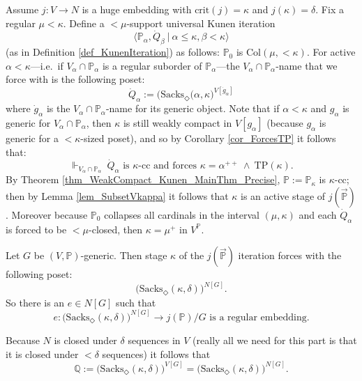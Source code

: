 \documentclass{amsart}
\begin{document}
Assume $j: V \to N$ is a huge embedding with $\text{crit}(j) = \kappa$ and $j(\kappa) = \delta$.  Fix a regular $\mu < \kappa$.  Define a $<\mu$-support universal Kunen iteration  
\[
\langle \mathbb{P}_\alpha, \dot{Q}_\beta \ | \ \alpha \le \kappa, \beta < \kappa \rangle
\]
(as in Definition \ref{def_KunenIteration}) as follows:  $\mathbb{P}_0$ is $\text{Col}(\mu, < \kappa)$.  For active $\alpha < \kappa$---i.e.\ if $V_\alpha \cap \mathbb{P}_\alpha$ is a regular suborder of $\mathbb{P}_\alpha$---the $V_\alpha \cap \mathbb{P}_\alpha$-name that we force with is the following poset:
\[
\dot{Q}_\alpha:= \Big(  \text{Sacks}_\Diamond(\alpha, \kappa \Big)^{V[\dot{g}_\alpha]}
\]
where $\dot{g}_\alpha$ is the $V_\alpha \cap \mathbb{P}_\alpha$-name for its generic object.  Note that if $\alpha < \kappa$ and $g_\alpha$ is generic for $V_\alpha \cap \mathbb{P}_\alpha$, then $\kappa$ is still weakly compact in $V[g_\alpha]$ (because $g_\alpha$ is generic for a $<\kappa$-sized poset), and so by Corollary \ref{cor_ForcesTP} it follows that:
\begin{equation*}
\Vdash_{V_\alpha \cap \mathbb{P}_\alpha} \ \dot{Q}_\alpha \text{ is } \kappa \text{-cc and forces } \kappa = \alpha^{++} \ \wedge \ \text{TP}(\kappa) .
\end{equation*}
By Theorem \ref{thm_WeakCompact_Kunen_MainThm_Precise}, $\mathbb{P}:= \mathbb{P}_\kappa$ is $\kappa$-cc; then by Lemma \ref{lem_SubsetVkappa} it follows that $\kappa$ is an active stage of $j(\vec{\mathbb{P}})$.  Moreover because $\mathbb{P}_0$ collapses all cardinals in the interval $(\mu,\kappa)$ and each $\dot{Q}_\alpha$ is forced to be $<\mu$-closed, then $\kappa = \mu^+$ in $V^{\mathbb{P}}$.  

Let $G$ be $(V,\mathbb{P})$-generic.  Then stage $\kappa$ of the $j(\vec{\mathbb{P}})$ iteration forces with the following poset:
\begin{equation}
\Big(\text{Sacks}_\Diamond(\kappa, \delta)\Big)^{N[G]}.
\end{equation}
So there is an $e \in N[G]$ such that
\[
e: \Big( \text{Sacks}_\Diamond(\kappa, \delta)\Big)^{N[G]} \to j(\mathbb{P})/G \text{ is a regular embedding}.
\]

Because $N$ is closed under $\delta$ sequences in $V$ (really all we need for this part is that it is closed under $<\delta$ sequences) it follows that 
\begin{equation}\label{eq_SamePoset}
\mathbb{Q}:=\Big(\text{Sacks}_\Diamond(\kappa, \delta)\Big)^{V[G]} = \Big(\text{Sacks}_\Diamond(\kappa, \delta)\Big)^{N[G]}.
\end{equation}
\end{document}
